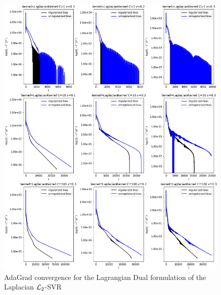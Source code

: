 \begin{figure}[H]
	\centering
	\includegraphics[scale=0.55]{img/laplacian_lagrangian_dual_l2_svr_loss_history}
	\caption{AdaGrad convergence for the Lagrangian Dual formulation of the Laplacian $\protect \mathcal{L}_2$-SVR}
	\label{fig:laplacian_lagrangian_dual_l2_svr_loss_history}
\end{figure}

